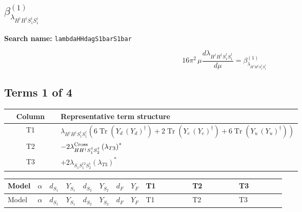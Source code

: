 \documentclass[8pt]{article}
\begin{document}
\begin{landscape}
\section*{$\beta_{\lambda_{H^\dagger H^\dagger S_1^\dagger S_1^\dagger}}^{(1)}$}
\noindent\textbf{Search name: }\texttt{lambdaHHdagS1barS1bar}\par\smallskip
\[16\pi^2\,\mu\frac{d \lambda_{H^\dagger H^\dagger S_1^\dagger S_1^\dagger}}{d\mu}=\beta_{\lambda_{H^\dagger H^\dagger S_1^\dagger S_1^\dagger}}^{(1)}\]
\subsection*{Terms 1 of 4}
\begin{center}
\begin{tabular}{@{}c >{\raggedright\arraybackslash}p{0.82\linewidth}@{}}
\toprule
Column & Representative term structure \\
\midrule
T1 & \(\displaystyle {\lambda_{H^\dagger H^\dagger S_1^\dagger S_1^\dagger}} (6 \operatorname{Tr}\!\left({Y_d}\,\left({Y_d}\right)^{\dagger}\right)+2 \operatorname{Tr}\!\left({Y_e}\,\left({Y_e}\right)^{\dagger}\right)+6 \operatorname{Tr}\!\left({Y_u}\,\left({Y_u}\right)^{\dagger}\right))\) \\
\midrule
T2 & \(\displaystyle -2 {\lambda_{H H^\dagger S_1^\dagger S_2^\dagger}^{\rm Cross}} \left({\lambda_{T3}}\right)^{*}\) \\
\midrule
T3 & \(\displaystyle +2 {\lambda_{S_1 S_1^{\dagger 2}S_2^\dagger}} \left({\lambda_{T3}}\right)^{*}\) \\
\midrule
\bottomrule
\end{tabular}
\end{center}
\smallskip
\tiny
\begin{longtable}{@{}llcccccc >{\raggedright\arraybackslash}p{0.21\linewidth} >{\raggedright\arraybackslash}p{0.21\linewidth} >{\raggedright\arraybackslash}p{0.21\linewidth}@{}}
\toprule
Model & $\alpha$ & $d_{S_1}$ & $Y_{S_1}$ & $d_{S_2}$ & $Y_{S_2}$ & $d_F$ & $Y_F$ & T1 & T2 & T3 \\
\midrule
\endfirsthead
\toprule
Model & $\alpha$ & $d_{S_1}$ & $Y_{S_1}$ & $d_{S_2}$ & $Y_{S_2}$ & $d_F$ & $Y_F$ & T1 & T2 & T3 \\
\midrule
\endhead

\end{longtable}
\end{landscape}
\end{document}
